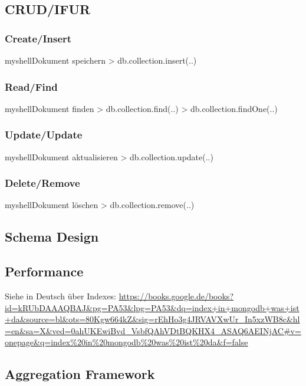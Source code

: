 \subsection{CRUD/IFUR}
\subsubsection{Create/Insert}
\begin{listingsboxShell}[label={lst:insert}]{myshell}{Dokument speichern}
> db.collection.insert(..)
\end{listingsboxShell}
\subsubsection{Read/Find}
\begin{listingsboxShell}[label={lst:find}]{myshell}{Dokument finden}
> db.collection.find(..)
> db.collection.findOne(..)
\end{listingsboxShell}
\subsubsection{Update/Update}
\begin{listingsboxShell}[label={lst:update}]{myshell}{Dokument aktualisieren}
> db.collection.update(..)
\end{listingsboxShell}
\subsubsection{Delete/Remove}
\begin{listingsboxShell}[label={lst:remove}]{myshell}{Dokument löschen}
> db.collection.remove(..)
\end{listingsboxShell}
\subsection{Schema Design}
\subsection{Performance}
Siehe in Deutsch über Indexes: \url{https://books.google.de/books?id=kRUbDAAAQBAJ&pg=PA53&lpg=PA53&dq=index+in+mongodb+was+ist+da&source=bl&ots=80Kgw664kZ&sig=rEhHo3g4JRVAVXwUr_In5xzWB8c&hl=en&sa=X&ved=0ahUKEwiBvd_VsbfQAhVDtBQKHX4_ASAQ6AEINjAC#v=onepage&q=index%20in%20mongodb%20was%20ist%20da&f=false}\newline

\subsection{Aggregation Framework}

